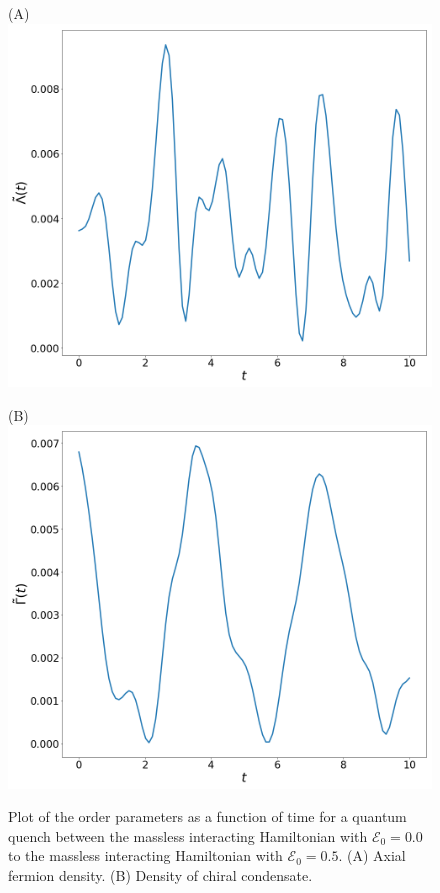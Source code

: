 \begin{figure}[h]
	\begin{minipage}{.5\textwidth}
		\centering(A)
		\includegraphics[scale=0.18]{figures/axialInteractingQuenchMassless.png}
	\end{minipage}%
	\begin{minipage}{0.5\textwidth}
		\centering(B)
		\includegraphics[scale=0.18]{figures/chiralInteractingQuenchMassless.png}
	\end{minipage}
	\caption{Plot of the order parameters as a function of time  for a quantum quench between the massless interacting Hamiltonian with $\mathcal{E}_0=0.0$ to the massless interacting Hamiltonian with $\mathcal{E}_0=0.5$. (A) Axial fermion density. (B) Density of chiral condensate.}\label{fig:orderparamsquech}
\end{figure}

